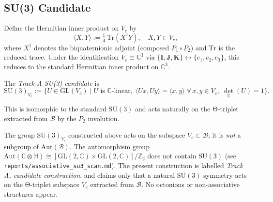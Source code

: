 \subsection{SU(3) Candidate}
\label{subsec:inv:su3}

Define the Hermitian inner product on $V_c$ by
\begin{equation}
  \langle X, Y \rangle := \tfrac{1}{4}\,\mathrm{Tr}(X^\dagger Y),
  \quad X, Y \in V_c,
  \label{eq:inv:inner_product}
\end{equation}
where $X^\dagger$ denotes the biquaternionic adjoint (composed $P_1 \circ P_2$)
and $\mathrm{Tr}$ is the reduced trace.  Under the identification
$V_c \cong \mathbb{C}^3$ via $\{\mathbf{I}, \mathbf{J}, \mathbf{K}\}
\leftrightarrow \{e_1, e_2, e_3\}$, this reduces to the standard Hermitian
inner product on $\mathbb{C}^3$.

\begin{definition}[SU(3) candidate]
  \label{def:inv:SU3}
  The \emph{Track-A SU(3) candidate} is
  \begin{equation}
    \mathrm{SU}(3)_{V_c} := \bigl\{
      U \in \mathrm{GL}(V_c)\;\big|\;
      U\text{ is }\mathbb{C}\text{-linear},\;
      \langle Ux, Uy\rangle = \langle x, y\rangle
      \;\forall\, x,y \in V_c,\;
      \det_\mathbb{C}(U) = 1
    \bigr\}.
  \end{equation}
\end{definition}

This is isomorphic to the standard $\mathrm{SU}(3)$ and acts naturally on
the Θ-triplet extracted from $\mathcal{B}$ by the $P_2$ involution.

\begin{remark}
  \label{rem:conservative}
  The group $\mathrm{SU}(3)_{V_c}$ constructed above acts on the subspace
  $V_c \subset \mathcal{B}$; it is \emph{not} a subgroup of
  $\mathrm{Aut}(\mathcal{B})$.  The automorphism group
  $\mathrm{Aut}(\mathbb{C}\otimes\mathbb{H})
  \cong [\mathrm{GL}(2,\mathbb{C})\times\mathrm{GL}(2,\mathbb{C})]/\mathbb{Z}_2$
  does not contain $\mathrm{SU}(3)$ (see \texttt{reports/associative\_su3\_scan.md}).
  The present construction is labelled \emph{Track A, candidate construction},
  and claims only that a natural $\mathrm{SU}(3)$ symmetry acts on the
  Θ-triplet subspace $V_c$ extracted from $\mathcal{B}$.
  No octonions or non-associative structures appear.
\end{remark}
